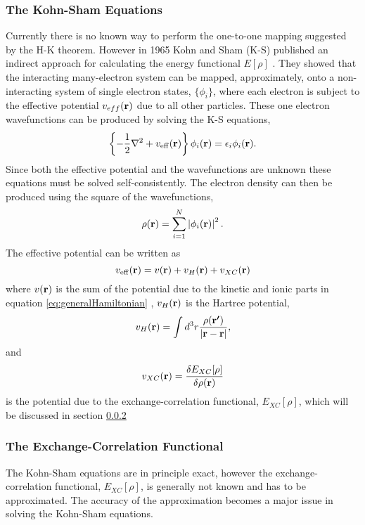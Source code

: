 \subsubsection{The Kohn-Sham Equations}
Currently there is no known way to perform the one-to-one mapping suggested by the H-K theorem. However in 1965 Kohn and Sham (K-S) published an indirect approach for calculating the energy functional $E[\rho]$ \cite{kohn1965}.
They showed that the interacting many-electron system can be mapped, approximately, onto a non-interacting system of single electron states, $\{\phi_i\}$, where each electron is subject to the effective potential $v_{eff}({\mathrm{\mathbf{\bm{r}}}})$ due to all other particles. These one electron wavefunctions can be produced by solving the K-S equations,
\begin{equation}
\label{eq:K-Sequation}
 \left\{-\frac{1}{2} \nabla ^2 + v_\mathrm{eff}({\mathrm{\mathbf{\bm{r}}}}) \right\} \phi_i({\mathrm{\mathbf{\bm{r}}}}) = \epsilon_i \phi_i({\mathrm{\mathbf{\bm{r}}}}).
\end{equation}
Since both the effective potential and the wavefunctions are unknown these equations must be solved self-consistently.
The electron density can then be produced using the square of the wavefunctions,
\begin{equation}
\label{eq:electronDensity}
 \rho({\mathrm{\mathbf{\bm{r}}}}) = \sum_{i=1}^N \left| \phi_i({\mathrm{\mathbf{\bm{r}}}}) \right|^2.
\end{equation}
The effective potential can be written as
\begin{equation}
\label{eq:effectivePotential}
 v_\mathrm{eff}({\mathrm{\mathbf{\bm{r}}}}) = v({\mathrm{\mathbf{\bm{r}}}}) + v_{H}({\mathrm{\mathbf{\bm{r}}}}) + v_{XC}({\mathrm{\mathbf{\bm{r}}}})
\end{equation}
where $v({\mathrm{\mathbf{\bm{r}}}})$ is the sum of the potential due to the kinetic and ionic parts in equation \ref{eq:generalHamiltonian}%
, $v_{H}({\mathrm{\mathbf{\bm{r}}}})$ is the Hartree potential,
\begin{equation}
\label{eq:hartreePotential}
 v_{H}({\mathrm{\mathbf{\bm{r}}}}) = \int d^3r \frac{\rho({\mathrm{\mathbf{\bm{r'}}}})}{\left| {\mathrm{\mathbf{\bm{r}}}} - {\mathrm{\mathbf{\bm{r}}}} \right|},
\end{equation}
and
\begin{equation}
\label{eq:XCpotential}
 v_{XC}({\mathrm{\mathbf{\bm{r}}}}) = \frac{\delta E_{XC}[\rho]}{\delta \rho({\mathrm{\mathbf{\bm{r}}}})}
\end{equation}
is the potential due to the exchange-correlation functional, $E_{XC}[\rho]$, which will be discussed in section \ref{sec:XCfunctional} 

\subsubsection{The Exchange-Correlation Functional}
\label{sec:XCfunctional}
The Kohn-Sham equations are in principle exact, however the exchange-correlation functional, $E_{XC}[\rho]$, is generally not known and has to be approximated. The accuracy of the approximation becomes a major issue in solving the Kohn-Sham equations.

